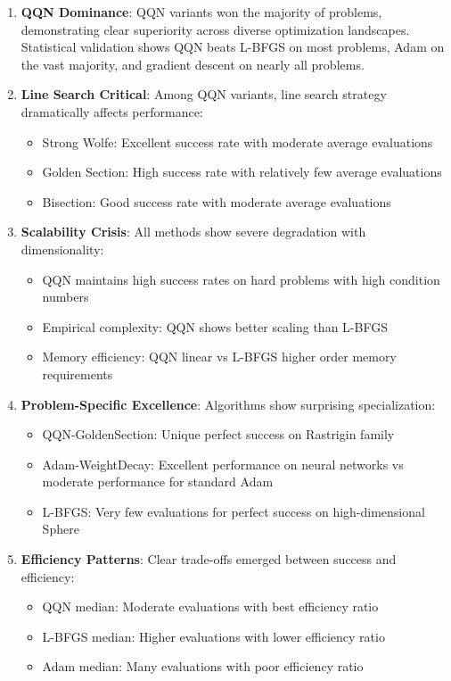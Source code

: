 \begin{enumerate}
\def\labelenumi{\arabic{enumi}.}
\item
  \textbf{QQN Dominance}: QQN variants won the majority of problems, demonstrating clear superiority across diverse optimization landscapes.
  Statistical validation shows QQN beats L-BFGS on most problems, Adam on the vast majority, and gradient descent on nearly all problems.
\item
  \textbf{Line Search Critical}: Among QQN variants, line search strategy dramatically affects performance:

  \begin{itemize}
  \tightlist
  \item
    Strong Wolfe: Excellent success rate with moderate average evaluations
  \item
    Golden Section: High success rate with relatively few average evaluations
  \item
    Bisection: Good success rate with moderate average evaluations
  \end{itemize}
\item
  \textbf{Scalability Crisis}: All methods show severe degradation with dimensionality:

  \begin{itemize}
  \tightlist
  \item
    QQN maintains high success rates on hard problems with high condition numbers
  \item
    Empirical complexity: QQN shows better scaling than L-BFGS
  \item
    Memory efficiency: QQN linear vs L-BFGS higher order memory requirements
  \end{itemize}
\item
  \textbf{Problem-Specific Excellence}: Algorithms show surprising specialization:

  \begin{itemize}
  \tightlist
  \item
    QQN-GoldenSection: Unique perfect success on Rastrigin family
  \item
    Adam-WeightDecay: Excellent performance on neural networks vs moderate performance for standard Adam
  \item
    L-BFGS: Very few evaluations for perfect success on high-dimensional Sphere
  \end{itemize}
\item
  \textbf{Efficiency Patterns}: Clear trade-offs emerged between success and efficiency:

  \begin{itemize}
  \tightlist
  \item
    QQN median: Moderate evaluations with best efficiency ratio
  \item
    L-BFGS median: Higher evaluations with lower efficiency ratio
  \item
    Adam median: Many evaluations with poor efficiency ratio
  \end{itemize}
\end{enumerate}


